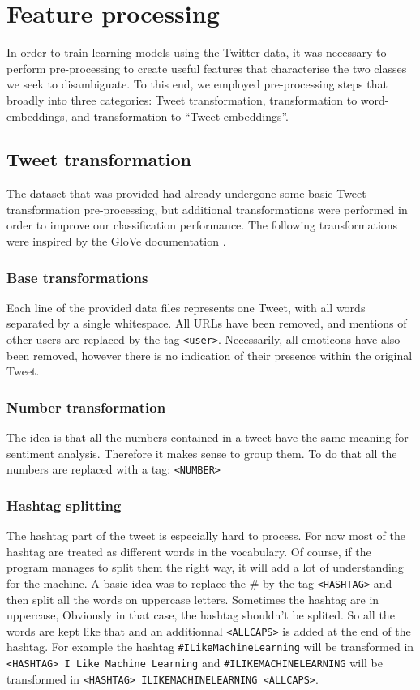 \section{Feature processing}
\label{sec:processing}
In order to train learning models using the Twitter data, it was necessary to perform pre-processing to create useful features that characterise the two classes we seek to disambiguate. To this end, we employed pre-processing steps that broadly into three categories: Tweet transformation, transformation to word-embeddings, and transformation to ``Tweet-embeddings''.

\subsection{Tweet transformation}
The dataset that was provided had already undergone some basic Tweet transformation pre-processing, but additional transformations were performed in order to improve our classification performance. The following transformations were inspired by the GloVe documentation \cite{glove}.

\subsubsection{Base transformations}
Each line of the provided data files represents one Tweet, with all words separated by a single whitespace. All URLs have been removed, and mentions of other users are replaced by the tag \texttt{<user>}. Necessarily, all emoticons have also been removed, however there is no indication of their presence within the original Tweet.

\subsubsection{Number transformation}
The idea is that all the numbers contained in a tweet have the same meaning for sentiment analysis. Therefore it makes sense to group them. To do that all the numbers are replaced with a tag: \texttt{<NUMBER>}

\subsubsection{Hashtag splitting}
The hashtag part of the tweet is especially hard to process. For now most of the hashtag are treated as different words in the vocabulary. Of course, if the program manages to split them the right way, it will add a lot of understanding for the machine. A basic idea was to replace the \# by the tag \texttt{<HASHTAG>} and then split all the words on uppercase letters. Sometimes the hashtag are in uppercase, Obviously in that case, the hashtag shouldn't be splited. So all the words are kept like that and an additionnal \texttt{<ALLCAPS>} is added at the end of the hashtag. For example the hashtag \texttt{\#ILikeMachineLearning} will be transformed in \texttt{<HASHTAG> I Like Machine Learning} and \texttt{\#ILIKEMACHINELEARNING} will be transformed in \texttt{<HASHTAG> ILIKEMACHINELEARNING <ALLCAPS>}. 

